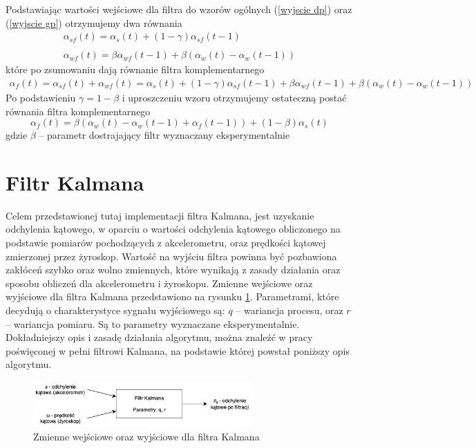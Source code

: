 Podstawiając wartości wejściowe dla filtra do wzorów ogólnych (\ref{wyjscie dp}) oraz (\ref{wyjscie gp}) otrzymujemy dwa równania
$$
    \begin{array}{cc}
        \alpha_{sf}(t) = \alpha_{s}(t) + (1 - \gamma)\alpha_{sf}(t-1) \\ \\
        \alpha_{wf}(t) = \beta \alpha_{wf}(t-1) + \beta(\alpha_w(t) - \alpha_w(t-1))
    \end{array}
$$
które po zsumowaniu dają równanie filtra komplementarnego
$$
    \begin{array}{cc}
        \alpha_f(t) = \alpha_{sf}(t) + \alpha_{wf}(t) = \alpha_{s}(t) + (1 - \gamma)\alpha_{sf}(t-1) + \beta \alpha_{wf}(t-1) + \beta(\alpha_w(t) - \alpha_w(t-1))
    \end{array}
$$
Po podstawieniu $\gamma = 1 - \beta$ i uproszczeniu wzoru otrzymujemy ostateczną postać równania filtra komplementarnego
\begin{equation}
    \alpha_f(t) = \beta(\alpha_w(t) - \alpha_w(t-1) + \alpha_f(t-1)) + (1 - \beta)\alpha_s(t)
\end{equation}
gdzie
$\beta$ -- parametr dostrajający filtr wyznaczany eksperymentalnie

\section{Filtr Kalmana}

Celem przedstawionej tutaj implementacji filtra Kalmana, jest uzyskanie odchylenia kątowego, w oparciu o wartości odchylenia kątowego obliczonego na podstawie pomiarów pochodzących z akcelerometru, oraz prędkości kątowej zmierzonej przez żyroskop. Wartość na wyjściu filtra powinna być pozbawiona zakłóceń szybko oraz wolno zmiennych, które wynikają z zasady działania oraz sposobu obliczeń dla akcelerometru i żyroskopu. Zmienne wejściowe oraz wyjściowe dla filtra Kalmana przedstawiono na rysunku \ref{Kalman idea}. Parametrami, które decydują o charakterystyce sygnału wyjściowego są: $q$ -- wariancja procesu, oraz $r$ -- wariancja pomiaru. Są to parametry wyznaczane eksperymentalnie. Dokładniejszy opis i zasadę działania algorytmu, można znaleźć w pracy \cite{Kalman} poświęconej w pełni filtrowi Kalmana, na podstawie której powstał poniższy opis algorytmu.

\begin{figure}[h!]
    \centering
    \includegraphics[width=0.75\textwidth]{Rysunki/Rozdzial04/Kalman_idea.png}
    \caption{Zmienne wejściowe oraz wyjściowe dla filtra Kalmana}
    \label{Kalman idea}
\end{figure}

